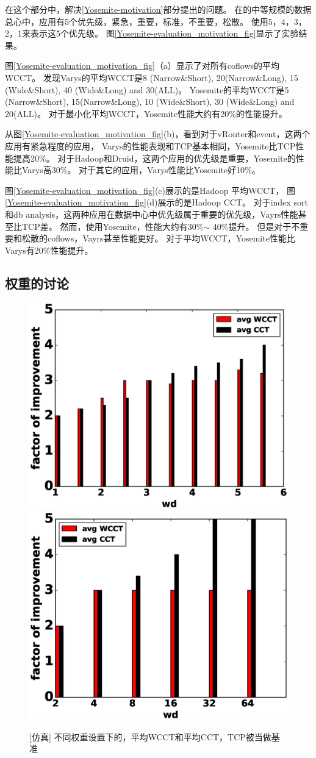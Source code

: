 在这个部分中，解决\ref{Yosemite-motivation}部分提出的问题。
在的中等规模的数据总心中，应用有5个优先级，紧急，重要，标准，不重要，松散。
使用5，4，3，2，1来表示这5个优先级。
图\ref{Yosemite-evaluation_motivation_fig}显示了实验结果。





图\ref{Yosemite-evaluation_motivation_fig}（a）显示了对所有coflows的平均WCCT。
发现Varys的平均WCCT是8 (Narrow\&Short), 20(Narrow\&Long), 15 (Wide\&Short), 40  (Wide\&Long) and 30(ALL)。
Yosemite的平均WCCT是5 (Narrow\&Short), 15(Narrow\&Long), 10 (Wide\&Short), 30  (Wide\&Long) and 20(ALL)。
对于最小化平均WCCT，Yosemite性能大约有20$\%$的性能提升。

从图\ref{Yosemite-evaluation_motivation_fig}(b)，看到对于vRouter和event，这两个应用有紧急程度的应用，
Varys的性能表现和TCP基本相同，Yosemite比TCP性能提高20$\%$。
对于Hadoop和Druid，这两个应用的优先级是重要，Yosemite的性能比Varys高30$\%$。
对于其它的应用，Varys性能比Yosemite好10$\%$。

图\ref{Yosemite-evaluation_motivation_fig}(c)展示的是Hadoop 平均WCCT，
图\ref{Yosemite-evaluation_motivation_fig}(d)展示的是Hadoop CCT。
对于index sort和db analysis，这两种应用在数据中心中优先级属于重要的优先级，Vayrs性能甚至比TCP差。
然而，使用Yosemite，性能大约有30\%$\sim$ 40\%提升。
但是对于不重要和松散的coflows，Vayrs甚至性能更好。
对于平均WCCT，Yosemite性能比Varys有20\%性能提升。

\subsection{权重的讨论}

\begin{figure}[h]
\centering
{}
 {\includegraphics[width=0.48\columnwidth]{figures/Yosemite/figs/evaluation/ex3/fake7.eps}}
{\includegraphics[width=0.48\columnwidth]{figures/Yosemite/figs/evaluation/ex3/fake8.eps}}
\caption{[仿真] 不同权重设置下的，平均WCCT和平均CCT，TCP被当做基准}
\label{Yosemite-evaluation_weight_fig}
\end{figure}

